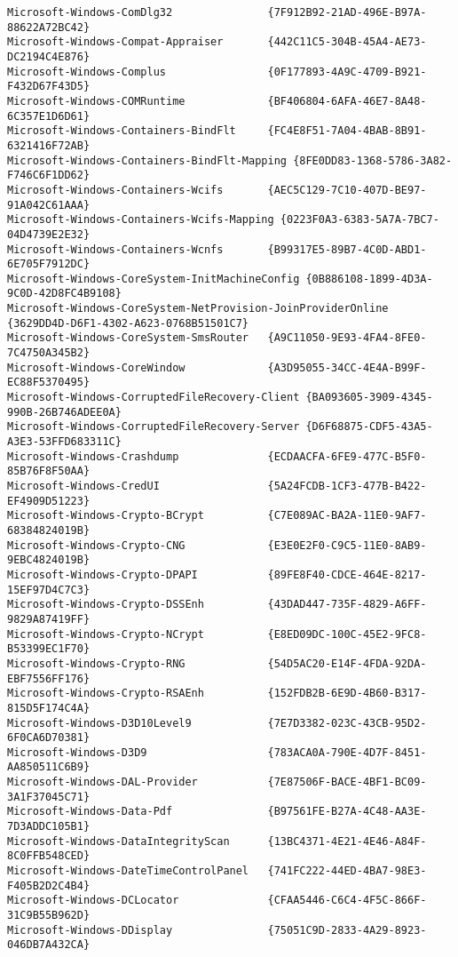 \documentclass{report}
\begin{document}
\begin{lstlisting}[breaklines=true,basicstyle=\tiny]
Microsoft-Windows-ComDlg32               {7F912B92-21AD-496E-B97A-88622A72BC42}
Microsoft-Windows-Compat-Appraiser       {442C11C5-304B-45A4-AE73-DC2194C4E876}
Microsoft-Windows-Complus                {0F177893-4A9C-4709-B921-F432D67F43D5}
Microsoft-Windows-COMRuntime             {BF406804-6AFA-46E7-8A48-6C357E1D6D61}
Microsoft-Windows-Containers-BindFlt     {FC4E8F51-7A04-4BAB-8B91-6321416F72AB}
Microsoft-Windows-Containers-BindFlt-Mapping {8FE0DD83-1368-5786-3A82-F746C6F1DD62}
Microsoft-Windows-Containers-Wcifs       {AEC5C129-7C10-407D-BE97-91A042C61AAA}
Microsoft-Windows-Containers-Wcifs-Mapping {0223F0A3-6383-5A7A-7BC7-04D4739E2E32}
Microsoft-Windows-Containers-Wcnfs       {B99317E5-89B7-4C0D-ABD1-6E705F7912DC}
Microsoft-Windows-CoreSystem-InitMachineConfig {0B886108-1899-4D3A-9C0D-42D8FC4B9108}
Microsoft-Windows-CoreSystem-NetProvision-JoinProviderOnline {3629DD4D-D6F1-4302-A623-0768B51501C7}
Microsoft-Windows-CoreSystem-SmsRouter   {A9C11050-9E93-4FA4-8FE0-7C4750A345B2}
Microsoft-Windows-CoreWindow             {A3D95055-34CC-4E4A-B99F-EC88F5370495}
Microsoft-Windows-CorruptedFileRecovery-Client {BA093605-3909-4345-990B-26B746ADEE0A}
Microsoft-Windows-CorruptedFileRecovery-Server {D6F68875-CDF5-43A5-A3E3-53FFD683311C}
Microsoft-Windows-Crashdump              {ECDAACFA-6FE9-477C-B5F0-85B76F8F50AA}
Microsoft-Windows-CredUI                 {5A24FCDB-1CF3-477B-B422-EF4909D51223}
Microsoft-Windows-Crypto-BCrypt          {C7E089AC-BA2A-11E0-9AF7-68384824019B}
Microsoft-Windows-Crypto-CNG             {E3E0E2F0-C9C5-11E0-8AB9-9EBC4824019B}
Microsoft-Windows-Crypto-DPAPI           {89FE8F40-CDCE-464E-8217-15EF97D4C7C3}
Microsoft-Windows-Crypto-DSSEnh          {43DAD447-735F-4829-A6FF-9829A87419FF}
Microsoft-Windows-Crypto-NCrypt          {E8ED09DC-100C-45E2-9FC8-B53399EC1F70}
Microsoft-Windows-Crypto-RNG             {54D5AC20-E14F-4FDA-92DA-EBF7556FF176}
Microsoft-Windows-Crypto-RSAEnh          {152FDB2B-6E9D-4B60-B317-815D5F174C4A}
Microsoft-Windows-D3D10Level9            {7E7D3382-023C-43CB-95D2-6F0CA6D70381}
Microsoft-Windows-D3D9                   {783ACA0A-790E-4D7F-8451-AA850511C6B9}
Microsoft-Windows-DAL-Provider           {7E87506F-BACE-4BF1-BC09-3A1F37045C71}
Microsoft-Windows-Data-Pdf               {B97561FE-B27A-4C48-AA3E-7D3ADDC105B1}
Microsoft-Windows-DataIntegrityScan      {13BC4371-4E21-4E46-A84F-8C0FFB548CED}
Microsoft-Windows-DateTimeControlPanel   {741FC222-44ED-4BA7-98E3-F405B2D2C4B4}
Microsoft-Windows-DCLocator              {CFAA5446-C6C4-4F5C-866F-31C9B55B962D}
Microsoft-Windows-DDisplay               {75051C9D-2833-4A29-8923-046DB7A432CA}

\end{lstlisting}
\end{document}

